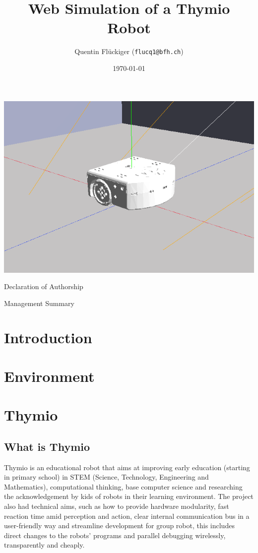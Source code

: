 \documentclass{scrartcl}
\begin{document}
\title{Web Simulation of a Thymio Robot}
\date{\today}   %
\author{Quentin Flückiger (\texttt{flucq1@bfh.ch})}




\maketitle
\includegraphics[width=\textwidth]{./title}
\clearpage

Declaration of Authorship
\clearpage
\clearpage

Management Summary
\clearpage
\clearpage

\tableofcontents
\clearpage

\section{Introduction}

\section{Environment}

\section{Thymio}
\subsection{What is Thymio} 

Thymio is an educational robot that aims at improving early education (starting in primary school) in STEM (Science, Technology, Engineering and Mathematics),
computational thinking, base computer science and researching the acknowledgement by kids of robots in their learning environment.
The project also had technical aims, such as how to provide hardware modularity, fast reaction time amid perception and action,
clear internal communication bus in a user-friendly way and streamline development for group robot, this includes direct changes to the robots’ programs and parallel debugging wirelessly, 
transparently and cheaply.\\
\end{document}
